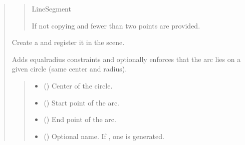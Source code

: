 \documentclass[letterpaper,10pt,english]{sphinxmanual}
\begin{document}
\begin{quote}
\begin{fulllineitems}
\begin{fulllineitems}
\begin{quote}
\begin{description}
\sphinxAtStartPar
LineSegment

\sphinxAtStartPar
{} \textendash{} If not copying and fewer than two points are provided.

\end{description}\end{quote}

\end{fulllineitems}


\begin{fulllineitems}
\label{\detokenize{pygeox:pygeox.add_objects.AddNamespace.major_arc}}
\pysigstartsignatures
\pysiglinewithargsret
{}
{\sphinxparamcomma {}\sphinxparamcomma {}\sphinxparamcomma {}\sphinxparamcomma {}}
{}
\pysigstopsignatures
\sphinxAtStartPar
Create a  and register it in the scene.

\sphinxAtStartPar
Adds equal\sphinxhyphen{}radius constraints and optionally enforces that the arc
lies on a given circle (same center and radius).
\begin{quote}\begin{description}
\begin{itemize}
\item {} 
\sphinxAtStartPar
{} () \textendash{} Center of the circle.

\item {} 
\sphinxAtStartPar
{} () \textendash{} Start point of the arc.

\item {} 
\sphinxAtStartPar
{} () \textendash{} End point of the arc.

\item {} 
\sphinxAtStartPar
{} (\sphinxstyleliteralemphasis{\sphinxupquote{ | }}) \textendash{} Optional name. If , one is generated.


\end{itemize}
\end{description}
\end{quote}
\end{fulllineitems}
\end{fulllineitems}
\end{quote}
\end{document}
